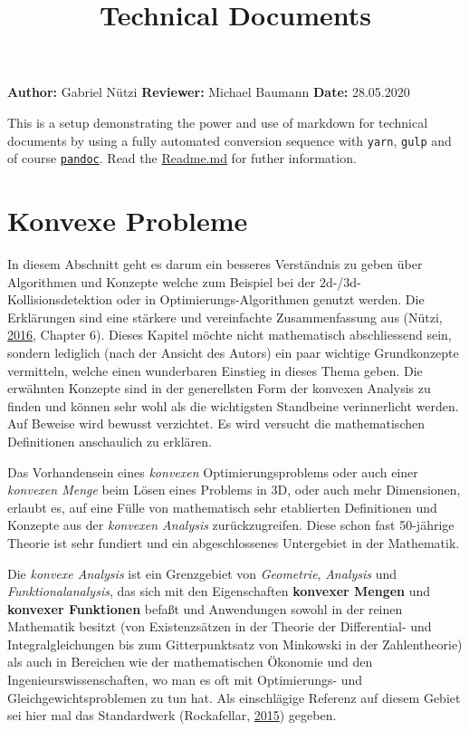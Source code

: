 \documentclass[
  12pt,
  american,
  a4paper,
  twoside,
  titlepage,
  openright,
  numbers=noenddot,
  chapterprefix=true,
  headings=optiontohead,
  svgnames,
  dvipsnames]{scrreprt}
\title{Technical Documents}
\author{}
\date{}
\begin{document}
\maketitle

{
\hypersetup{linkcolor=Black}
\setcounter{tocdepth}{2}
\tableofcontents
}
\textbf{Author:} Gabriel Nützi \textbf{Reviewer:} Michael Baumann
\textbf{Date:} 28.05.2020

This is a setup demonstrating the power and use of markdown for
technical documents by using a fully automated conversion sequence with
\texttt{yarn}, \texttt{gulp} and of course
\href{www.pandoc.org}{\texttt{pandoc}}. Read the
\href{https://github.com/gabyx/TechnicalMarkdown/blob/master/Readme.md}{Readme.md}
for futher information.

\hypertarget{konvexe-probleme}{%
\chapter{Konvexe Probleme}\label{konvexe-probleme}}

In diesem Abschnitt geht es darum ein besseres Verständnis zu geben über
Algorithmen und Konzepte welche zum Beispiel bei der
\(2\)d-/\(3\)d-Kollisionsdetektion oder in Optimierungs-Algorithmen
genutzt werden. Die Erklärungen sind eine stärkere und vereinfachte
Zusammenfassung aus (Nützi,
\protect\hyperlink{ref-nuetzig_thesis_2016}{2016}, Chapter 6). Dieses
Kapitel möchte nicht mathematisch abschliessend sein, sondern lediglich
(nach der Ansicht des Autors) ein paar wichtige Grundkonzepte
vermitteln, welche einen wunderbaren Einstieg in dieses Thema geben. Die
erwähnten Konzepte sind in der generellsten Form der konvexen Analysis
zu finden und können sehr wohl als die wichtigsten Standbeine
verinnerlicht werden. Auf Beweise wird bewusst verzichtet. Es wird
versucht die mathematischen Definitionen anschaulich zu erklären.

Das Vorhandensein eines \emph{konvexen} Optimierungsproblems oder auch
einer \emph{konvexen Menge} beim Lösen eines Problems in \(3\)D, oder
auch mehr Dimensionen, erlaubt es, auf eine Fülle von mathematisch sehr
etablierten Definitionen und Konzepte aus der \emph{konvexen Analysis}
zurückzugreifen. Diese schon fast 50-jährige Theorie ist sehr fundiert
und ein abgeschlossenes Untergebiet in der Mathematik.

Die \emph{konvexe Analysis} ist ein Grenzgebiet von \emph{Geometrie},
\emph{Analysis} und \emph{Funktionalanalysis}, das sich mit den
Eigenschaften \textbf{konvexer Mengen} und \textbf{konvexer Funktionen}
befaßt und Anwendungen sowohl in der reinen Mathematik besitzt (von
Existenzsätzen in der Theorie der Differential- und Integralgleichungen
bis zum Gitterpunktsatz von Minkowski in der Zahlentheorie) als auch in
Bereichen wie der mathematischen Ökonomie und den
Ingenieurswissenschaften, wo man es oft mit Optimierungs- und
Gleichgewichtsproblemen zu tun hat. Als einschlägige Referenz auf diesem
Gebiet sei hier mal das Standardwerk (Rockafellar,
\protect\hyperlink{ref-rockafellar_convex_2015}{2015}) gegeben.
\end{document}
